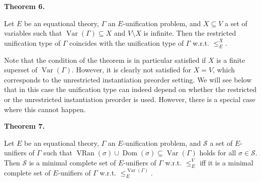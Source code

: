  
 
\par\medskip\noindent\textbf{Theorem 6.}\par
 
 
Let $E$ be an equational theory, $\Gamma$ an $E$-unification problem, and $X\subseteq V$ a set of variables such that $\operatorname{Var}(\Gamma)\subseteq X$ and $V\setminus X$ is infinite. Then the restricted unification type of $\Gamma$ coincides with the unification type of $\Gamma$ w.r.t. $\leq_{E}^{X}$.\par
 
 
 
 
Note that the condition of the theorem is in particular satisfied if $X$ is a finite superset of $\operatorname{Var}(\Gamma)$. However, it is clearly not satisfied for $X=V$, which corresponds to the unrestricted instantiation preorder setting. We will see below that in this case the unification type can indeed depend on whether the restricted or the unrestricted instantiation preorder is used. However, there is a special case where this cannot happen.\par
 
 
 
\par\medskip\noindent\textbf{Theorem 7.}\par
 
 
Let $E$ be an equational theory, $\Gamma$ an $E$-unification problem, and $\mathcal{S}$ a set of $E$-unifiers of $\Gamma$ such that $\operatorname{VRan}(\sigma)\cup\operatorname{Dom}(\sigma)\subseteq%
\operatorname{Var}(\Gamma)$ holds for all $\sigma\in\mathcal{S}$. Then $\mathcal{S}$ is a minimal complete set of $E$-unifiers of $\Gamma$ w.r.t. $\leq_{E}^{V}$ iff it is a minimal complete set of $E$-unifiers of $\Gamma$ w.r.t. $\leq_{E}^{\operatorname{Var}(\Gamma)}$.\par
 
 
 
 
